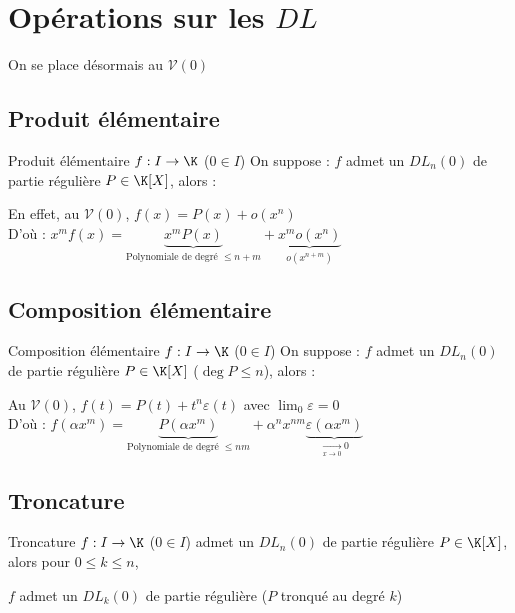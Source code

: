 \documentclass[12pt,a4paper]{report}
\begin{document}
\section{Opérations sur les $DL$}
On se place désormais au $\mathcal{V} (0)$

\subsection{Produit élémentaire}
\begin{proposition}{Produit élémentaire}{}
$f:I\to \K$ ($0\in I$)
On suppose : $f$ admet un $DL_n (0)$ de partie régulière $P\in \K[X]$, alors :
\begin{center}
\end{center}
\end{proposition}

\begin{demo}
En effet, au $\mathcal{V}(0)$, $f(x)=P(x)+o(x^n)$\\
D'où : $x^m f(x) = \underbrace{x^m P(x)}_{\text{Polynomiale de degré } \leq n+m} + \underbrace{x^m o(x^n)}_{o(x^{n+m})}$
\end{demo}

\subsection{Composition élémentaire}
\begin{proposition}{Composition élémentaire}{}
$f:I\to \K$ ($0\in I$)
On suppose : $f$ admet un $DL_n (0)$ de partie régulière $P\in \K[X]$ ($\deg P \leq n$), alors :
\begin{center}
\end{center}
\end{proposition}

\begin{demo}
Au $\mathcal{V}(0)$, $f(t)=P(t)+t^n\varepsilon(t)$ avec $\displaystyle\lim_{0} \varepsilon = 0$\\
D'où : $f(\alpha x^m ) = \underbrace{P(\alpha x^m)}_{\text{Polynomiale de degré } \leq nm} + \alpha^n x^{nm} \underbrace{ \varepsilon(\alpha x^m)}_{\xrightarrow[x \to 0]{} 0}$
\end{demo}

\subsection{Troncature}
\begin{proposition}{Troncature}{}
$f:I\to \K$ ($0\in I$) admet un $DL_n (0)$ de partie régulière $P\in \K[X]$, alors pour $0\leq k \leq n$,
\begin{center}
    $f$ admet un $DL_k (0)$ de partie régulière  ($P$ tronqué au degré $k$)
\end{center}
\end{proposition}
\end{document}
